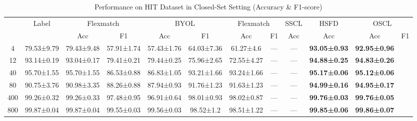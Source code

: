 \documentclass[journal]{IEEEtran}
\begin{document}
\begin{table}[!t]
\centering
\caption{Performance on HIT Dataset in Closed-Set Setting (Accuracy \& F1-score)}
\label{tab:hit_closed_set}
\small
\setlength{\tabcolsep}{2.2pt}
\begin{tabular}{@{\hspace{2pt}}c|c|cc|cc|cc|c|c|cc@{\hspace{2pt}}}
  \toprule
  & Label & \multicolumn{2}{c}{Flexmatch} & \multicolumn{2}{c}{BYOL} & 
  \multicolumn{2}{c}{Flexmatch} & \multicolumn{1}{c}{SSCL} & 
  \multicolumn{1}{c}{HSFD} & \multicolumn{2}{c}{OSCL} \\
  \cmidrule{3-12}
  & & Acc & F1 & Acc & F1 & Acc & F1 & Acc & Acc & Acc & F1 \\
  \midrule
  4    & 79.53±9.79   & 79.43±9.48   & 57.91±1.74  & 57.43±1.76  & 64.03±7.36  & 61.27±4.6   & ---  & ---  & \textbf{93.05±0.93}  & \textbf{92.95±0.96} \\
  12   & 93.14±0.19   & 93.04±0.17   & 79.41±0.21  & 79.44±0.25  & 75.96±2.65  & 72.55±4.27  & ---  & ---  & \textbf{94.88±0.25}  & \textbf{94.83±0.26} \\
  40   & 95.70±1.55   & 95.70±1.55   & 86.53±0.88  & 86.83±1.05  & 93.21±1.66  & 93.24±1.66  & ---  & ---  & \textbf{95.17±0.06}  & \textbf{95.12±0.06} \\
  80   & 90.75±3.76   & 90.98±3.35   & 88.26±0.88  & 87.94±0.93  & 91.76±1.23  & 91.63±1.23  & ---  & ---  & \textbf{94.99±0.16}  & \textbf{94.95±0.17} \\
  400  & 99.26±0.32   & 99.26±0.33   & 97.48±0.95  & 96.91±0.64  & 98.01±0.93  & 98.02±0.87  & ---  & ---  & \textbf{99.76±0.03}  & \textbf{99.76±0.05} \\
  800  & 99.87±0.04   & 99.87±0.04   & 99.55±0.03  & 99.56±0.03  & 98.52±1.2   & 98.51±1.22  & ---  & ---  & \textbf{99.85±0.06}  & \textbf{99.86±0.07} \\
  \bottomrule
\end{tabular}
\end{table}
\end{document}
